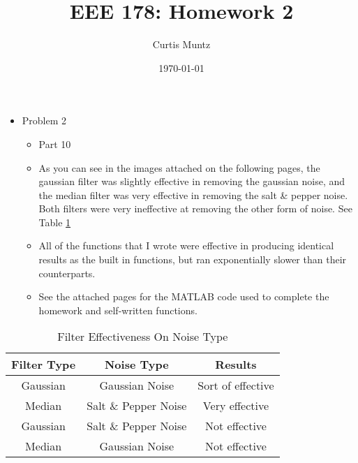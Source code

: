 \documentclass{article}
\title{EEE 178: Homework 2}
\date{\today}
\author{Curtis Muntz}
\begin{document}
\maketitle
\begin{itemize}
	\item Problem 2
	\begin{itemize}
		\item Part 10
		\item[] As you can see in the images attached on the following pages, the gaussian filter was slightly effective in removing the gaussian noise, and the median filter was very effective in removing the salt \& pepper noise. Both filters were very ineffective at removing the other form of noise. See Table \ref{table:filtertable}
		\item[] All of the functions that I wrote were effective in producing identical results as the built in functions, but ran exponentially slower than their counterparts.
		\item[] See the attached pages for the MATLAB code used to complete the homework and self-written functions. 


	\end{itemize}
\end{itemize}

\begin{table}[ht]
\caption{Filter Effectiveness On Noise Type}
\centering
\begin{tabular}{c c c}
\hline
\hline
Filter Type & Noise Type & Results\\
\hline
Gaussian & Gaussian Noise & Sort of effective\\
Median & Salt \& Pepper Noise & Very effective\\
Gaussian & Salt \& Pepper Noise & Not effective\\
Median & Gaussian Noise & Not effective \\
\hline
\end{tabular}
\label{table:filtertable}
\end{table}





\end{document}
